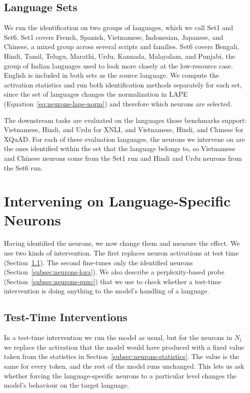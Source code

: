 \subsection{Language Sets}
\label{subsec:neurons-langsets}

We run the identification on two groups of languages, which we call Set1 and Set6.
Set1 covers French, Spanish, Vietnamese, Indonesian, Japanese, and Chinese, a mixed
group across several scripts and families. Set6 covers Bengali, Hindi, Tamil,
Telugu, Marathi, Urdu, Kannada, Malayalam, and Punjabi, the group of Indian
languages used to look more closely at the low-resource case. English is included
in both sets as the source language. We compute the activation statistics and run
both identification methods separately for each set, since the set of languages
changes the normalization in LAPE (Equation~\ref{eq:neurons-lape-norm}) and
therefore which neurons are selected.

The downstream tasks are evaluated on the languages those benchmarks support:
Vietnamese, Hindi, and Urdu for XNLI, and Vietnamese, Hindi, and Chinese for XQuAD.
For each of these evaluation languages, the neurons we intervene on are the ones
identified within the set that the language belongs to, so Vietnamese and Chinese
neurons come from the Set1 run and Hindi and Urdu neurons from the Set6 run.

\section{Intervening on Language-Specific Neurons}
\label{sec:neurons-intervene}

Having identified the neurons, we now change them and measure the effect. We use
two kinds of intervention. The first replaces neuron activations at test time
(Section~\ref{subsec:neurons-testtime}). The second fine-tunes only the identified
neurons (Section~\ref{subsec:neurons-lora}). We also describe a perplexity-based
probe (Section~\ref{subsec:neurons-ppxc}) that we use to check whether a test-time
intervention is doing anything to the model's handling of a language.

\subsection{Test-Time Interventions}
\label{subsec:neurons-testtime}

In a test-time intervention we run the model as usual, but for the neurons in
$N_l$ we replace the activation that the model would have produced with a fixed
value taken from the statistics in Section~\ref{subsec:neurons-statistics}. The
value is the same for every token, and the rest of the model runs unchanged. This
lets us ask whether forcing the language-specific neurons to a particular level
changes the model's behaviour on the target language.

